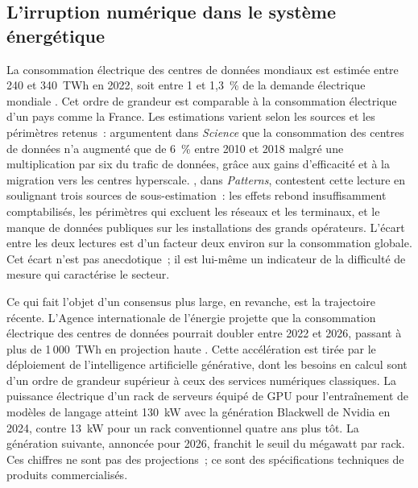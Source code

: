 \subsection{L'irruption numérique dans le système énergétique}\label{subsec:irruption}

La consommation électrique des centres de données mondiaux est estimée entre 240 et 340~TWh en 2022, soit entre 1 et 1,3~\% de la demande électrique mondiale \parencite{iea_electricity_2024}. Cet ordre de grandeur est comparable à la consommation électrique d'un pays comme la France. Les estimations varient selon les sources et les périmètres retenus~: \textcite{masanet_recalibrating_2020} argumentent dans \emph{Science} que la consommation des centres de données n'a augmenté que de 6~\% entre 2010 et 2018 malgré une multiplication par six du trafic de données, grâce aux gains d'efficacité et à la migration vers les centres hyperscale. \textcite{freitag_real_2021}, dans \emph{Patterns}, contestent cette lecture en soulignant trois sources de sous-estimation~: les effets rebond insuffisamment comptabilisés, les périmètres qui excluent les réseaux et les terminaux, et le manque de données publiques sur les installations des grands opérateurs. L'écart entre les deux lectures est d'un facteur deux environ sur la consommation globale. Cet écart n'est pas anecdotique~; il est lui-même un indicateur de la difficulté de mesure qui caractérise le secteur.

Ce qui fait l'objet d'un consensus plus large, en revanche, est la trajectoire récente. L'Agence internationale de l'énergie projette que la consommation électrique des centres de données pourrait doubler entre 2022 et 2026, passant à plus de 1\,000~TWh en projection haute \parencite{iea_electricity_2024}. Cette accélération est tirée par le déploiement de l'intelligence artificielle générative, dont les besoins en calcul sont d'un ordre de grandeur supérieur à ceux des services numériques classiques. La puissance électrique d'un rack de serveurs équipé de GPU pour l'entraînement de modèles de langage atteint 130~kW avec la génération Blackwell de Nvidia en 2024, contre 13~kW pour un rack conventionnel quatre ans plus tôt. La génération suivante, annoncée pour 2026, franchit le seuil du mégawatt par rack. Ces chiffres ne sont pas des projections~; ce sont des spécifications techniques de produits commercialisés.

